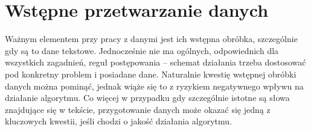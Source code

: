 \documentclass{praca1}
\begin{document}
\section{Wstępne przetwarzanie danych}

Ważnym elementem przy pracy z danymi jest ich wstępna obróbka, szczególnie gdy są to dane tekstowe. Jednocześnie nie ma ogólnych, odpowiednich dla wszystkich zagadnień, reguł postępowania -- schemat działania trzeba dostosować pod konkretny problem i posiadane dane. Naturalnie kwestię wstępnej obróbki danych można pominąć, jednak wiąże się to z ryzykiem negatywnego wpływu na działanie algorytmu. Co więcej w przypadku gdy szczególnie istotne są słowa znajdujące się w tekście, przygotowanie danych może okazać się jedną z kluczowych kwestii, jeśli chodzi o jakość działania algorytmu.
\end{document}
